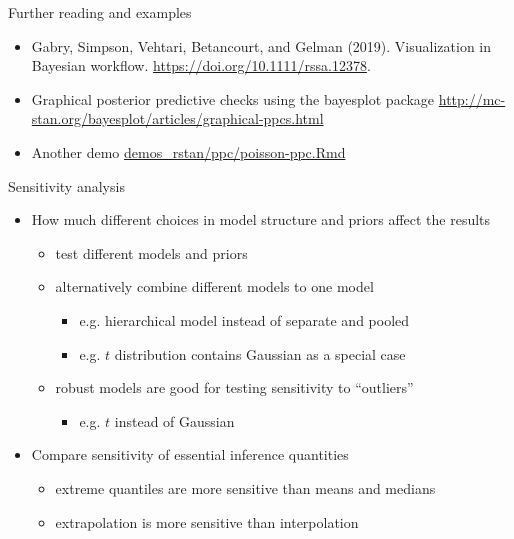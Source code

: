 \documentclass[t]{beamer}
\begin{document}
\begin{frame}{Further reading and examples}

  \begin{itemize}
  \item Gabry, Simpson, Vehtari, Betancourt, and Gelman
    (2019). Visualization in Bayesian
    workflow. \url{https://doi.org/10.1111/rssa.12378}.
  \item Graphical posterior predictive checks using the bayesplot package
    \url{http://mc-stan.org/bayesplot/articles/graphical-ppcs.html}
  \item Another demo \href{http://avehtari.github.io/BDA_R_demos/demos_rstan/ppc/poisson-ppc.html}{demos\_rstan/ppc/poisson-ppc.Rmd}
  \end{itemize}
  
\end{frame}

\begin{frame}{Sensitivity analysis}

  \begin{itemize}
  \item How much different choices in model structure and priors affect the results
    \begin{itemize}
      \item<2-> test different models and priors
      \item<3-> alternatively combine different models to one model
        \begin{itemize}
        \item e.g. hierarchical model instead of separate and pooled
        \item e.g. $t$ distribution contains Gaussian as a special case
      \end{itemize}
      \item<3-> robust models are good for testing sensitivity to ``outliers''
        \begin{itemize}
        \item e.g. $t$ instead of Gaussian
        \end{itemize}
    \end{itemize}
    \item<4-> Compare sensitivity of essential inference quantities
      \begin{itemize}
      \item extreme quantiles are more sensitive than means and medians
      \item extrapolation is more sensitive than interpolation
      \end{itemize}
    \end{itemize}

\end{frame}
\end{document}
